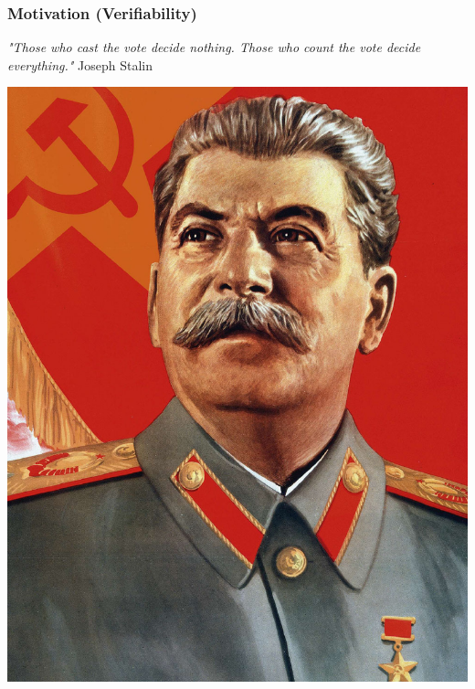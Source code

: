 \documentclass{beamer}
\begin{document}
\begin{frame}
\frametitle{Motivation (Verifiability)}
\textit{"Those who cast the vote decide nothing.  Those who 
count the vote decide everything."}  Joseph Stalin
\begin{center}
\includegraphics[scale=0.12]{joseph.jpg}
\end{center}
\end{frame}
\end{document}
